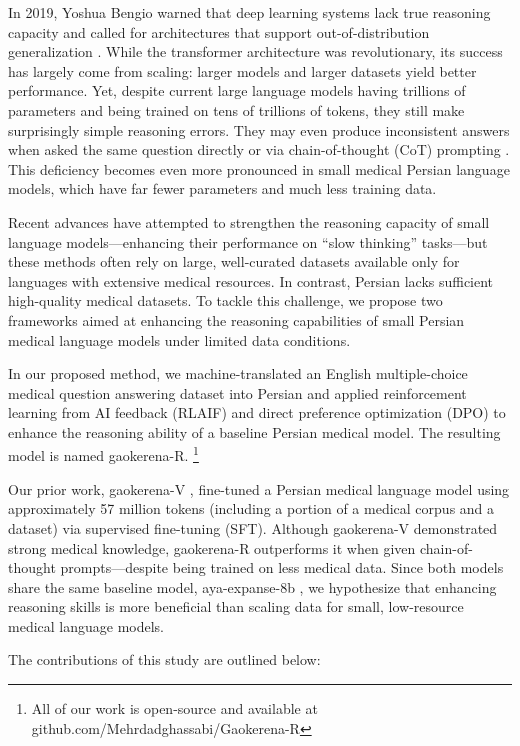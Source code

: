 \documentclass[conference]{IEEEtran}
\begin{document}
In 2019, Yoshua Bengio warned that deep learning systems lack true reasoning capacity and called for architectures that support out-of-distribution generalization
\cite{b3}.  
While the transformer architecture was revolutionary, its success has largely come from scaling: larger models and larger datasets yield better performance.  
Yet, despite current large language models having trillions of parameters and being trained on tens of trillions of tokens, they still make surprisingly simple reasoning errors.  
They may even produce inconsistent answers when asked the same question directly or via chain-of-thought (CoT) prompting
\cite{b4}.  
This deficiency becomes even more pronounced in small medical Persian language models, which have far fewer parameters and much less training data.

Recent advances have attempted to strengthen the reasoning capacity of small language models—enhancing their performance on “slow thinking” tasks—but these methods often rely on large, well-curated datasets available only for languages with extensive medical resources.
In contrast, Persian lacks sufficient high-quality medical datasets.  
To tackle this challenge, we propose two frameworks aimed at enhancing the reasoning capabilities of small Persian medical language models under limited data conditions.

In our proposed method, we machine-translated an English multiple-choice medical question answering dataset into Persian and applied reinforcement learning from AI feedback (RLAIF)
\cite{b5} and direct preference optimization (DPO)
\cite{b6} to enhance the reasoning ability of a baseline Persian medical model.  
The resulting model is named gaokerena-R.
\footnote{All of our work is open-source and available at github.com/Mehrdadghassabi/Gaokerena-R}

Our prior work, gaokerena-V
\cite{b7}, fine-tuned a Persian medical language model using approximately 57 million tokens (including a portion of a medical corpus and a dataset) via supervised fine-tuning (SFT).  
Although gaokerena-V demonstrated strong medical knowledge, gaokerena-R outperforms it when given chain-of-thought prompts—despite being trained on less medical data.  
Since both models share the same baseline model, aya-expanse-8b
\cite{b8}, we hypothesize that enhancing reasoning skills is more beneficial than scaling data for small, low-resource medical language models.

The contributions of this study are outlined below:
\end{document}
